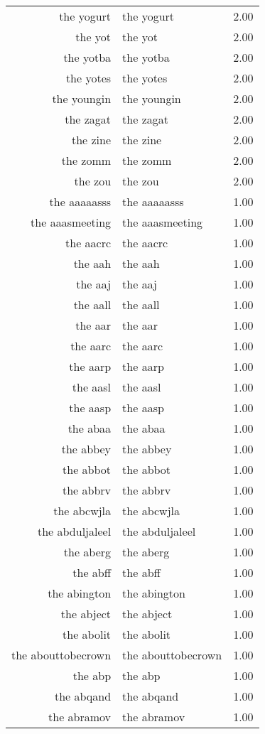 \begin{table}[ht]
\begin{tabular}{rlr}
  the yogurt & the yogurt & 2.00 \\ 
  the yot & the yot & 2.00 \\ 
  the yotba & the yotba & 2.00 \\ 
  the yotes & the yotes & 2.00 \\ 
  the youngin & the youngin & 2.00 \\ 
  the zagat & the zagat & 2.00 \\ 
  the zine & the zine & 2.00 \\ 
  the zomm & the zomm & 2.00 \\ 
  the zou & the zou & 2.00 \\ 
  the aaaaasss & the aaaaasss & 1.00 \\ 
  the aaasmeeting & the aaasmeeting & 1.00 \\ 
  the aacrc & the aacrc & 1.00 \\ 
  the aah & the aah & 1.00 \\ 
  the aaj & the aaj & 1.00 \\ 
  the aall & the aall & 1.00 \\ 
  the aar & the aar & 1.00 \\ 
  the aarc & the aarc & 1.00 \\ 
  the aarp & the aarp & 1.00 \\ 
  the aasl & the aasl & 1.00 \\ 
  the aasp & the aasp & 1.00 \\ 
  the abaa & the abaa & 1.00 \\ 
  the abbey & the abbey & 1.00 \\ 
  the abbot & the abbot & 1.00 \\ 
  the abbrv & the abbrv & 1.00 \\ 
  the abcwjla & the abcwjla & 1.00 \\ 
  the abduljaleel & the abduljaleel & 1.00 \\ 
  the aberg & the aberg & 1.00 \\ 
  the abff & the abff & 1.00 \\ 
  the abington & the abington & 1.00 \\ 
  the abject & the abject & 1.00 \\ 
  the abolit & the abolit & 1.00 \\ 
  the abouttobecrown & the abouttobecrown & 1.00 \\ 
  the abp & the abp & 1.00 \\ 
  the abqand & the abqand & 1.00 \\ 
  the abramov & the abramov & 1.00 \\ 

\end{tabular}
\end{table}
